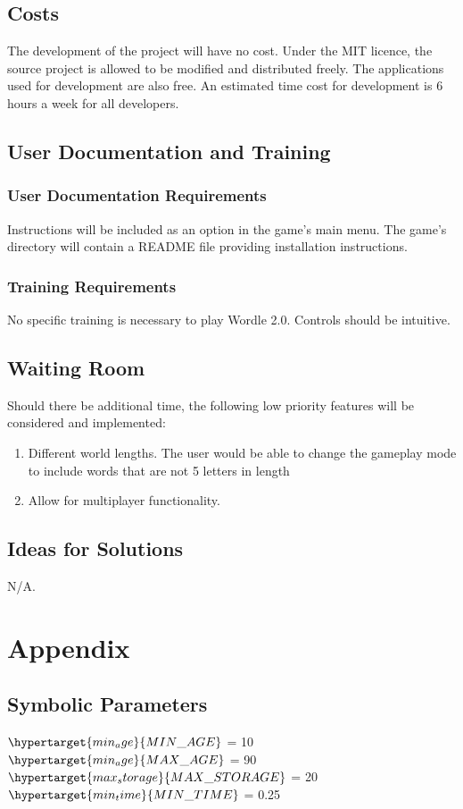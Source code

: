 \documentclass[12pt, titlepage]{article}
\begin{document}
	\subsection{Costs}
	
	The development of the project will have no cost. Under the MIT licence, the
	source project is allowed to be modified and distributed freely. 
	The
	applications used for development are also free. An estimated time cost for
	development is 6 hours a week for all developers. 
	
	\subsection{User Documentation and Training}
	\subsubsection{User Documentation Requirements}
	Instructions will be included as an option in the game's main menu.
	The game's directory will contain a README file providing installation 
	instructions.
	
	\subsubsection{Training Requirements}
	No specific training is necessary to play Wordle 2.0. Controls should be 
	intuitive.
	
	\subsection{Waiting Room}
	Should there be additional time, the following low priority features will 
	be 
	considered and implemented:
	
	\begin{enumerate}
		\item Different world lengths. The user would be able to change the 
		gameplay mode to include words that are not 5 letters in length
		\item Allow for multiplayer functionality.
	\end{enumerate}
	
	\subsection{Ideas for Solutions}
	N/A.
	
	
	
	\nocite{*}
	
	\newpage
	
	\section{Appendix}
	
	\subsection{Symbolic Parameters}
	$\hypertarget{min_age}{MIN\_AGE}$ = 10\\
	$\hypertarget{min_age}{MAX\_AGE}$ = 90\\
	$\hypertarget{max_storage}{MAX\_STORAGE}$ = 20\\
	$\hypertarget{min_time}{MIN\_TIME}$ = 0.25\\
	
	
\end{document}
